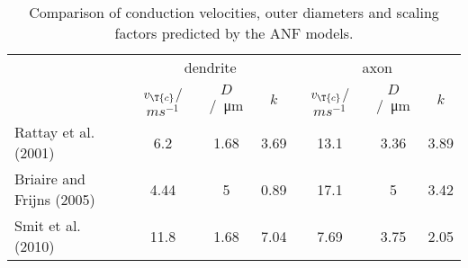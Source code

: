 \begin{table}[htb]
\centering
\caption{Comparison of conduction velocities, outer diameters and scaling factors predicted by the ANF models.}
\begin{tabular}{l|ccc|ccc}
& \multicolumn{3}{c|}{dendrite} & \multicolumn{3}{c}{axon}\\
& $v_{\T{c}}$/$ms^{-1}$ & $D$/\SI{}{\micro\meter} & $k$ & $v_{\T{c}}$/$ms^{-1}$ & $D$/\SI{}{\micro\meter} & $k$\\\hline
Rattay et al. (2001) & 6.2 & 1.68 & 3.69 & 13.1 & 3.36 & 3.89\\
Briaire and Frijns (2005) & 4.44 & 5 & 0.89 & 17.1 & 5 & 3.42\\
Smit et al. (2010) & 11.8 & 1.68 & 7.04 & 7.69 & 3.75 & 2.05\\
\end{tabular}
\label{tbl:con_vel_table}
\end{table}